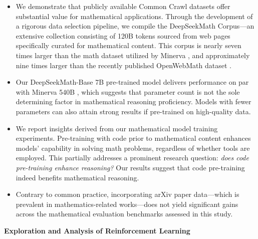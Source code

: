 \begin{itemize}[topsep=0pt]
    \item We demonstrate that publicly available Common Crawl datasets offer substantial value for mathematical applications. Through the development of a rigorous data selection pipeline, we compile the DeepSeekMath Corpus—an extensive collection consisting of 120B tokens sourced from web pages specifically curated for mathematical content. This corpus is nearly seven times larger than the math dataset utilized by Minerva \citep{minerva}, and approximately nine times larger than the recently published OpenWebMath dataset \citep{openwebmath}.

    \item Our DeepSeekMath-Base 7B pre-trained model delivers performance on par with Minerva 540B \citep{minerva}, which suggests that parameter count is not the sole determining factor in mathematical reasoning proficiency. Models with fewer parameters can also attain strong results if pre-trained on high-quality data.

    \item We report insights derived from our mathematical model training experiments. Pre-training with code prior to mathematical content enhances models' capability in solving math problems, regardless of whether tools are employed. This partially addresses a prominent research question: \textit{does code pre-training enhance reasoning?} Our results suggest that code pre-training indeed benefits mathematical reasoning.

    \item Contrary to common practice, incorporating arXiv paper data—which is prevalent in mathematics-related works—does not yield significant gains across the mathematical evaluation benchmarks assessed in this study.
\end{itemize}

\textbf{Exploration and Analysis of Reinforcement Learning}

